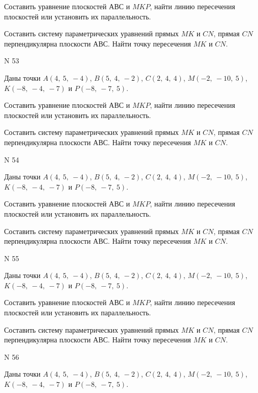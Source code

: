\documentclass[11pt]{report}
\begin{document}
Составить уравнение плоскостей $АВС$ и $MKP$,
найти линию пересечения плоскостей или установить их параллельность.

Составить систему параметрических уравнений прямых $MK$ и $CN$,
прямая $CN$ перпендикулярна плоскости $АВС$. 
Найти точку пересечения $MK$ и $CN$.



 N 53

Даны точки $A\left( 4, \  5, \  -4\right)$, $B\left( 5, \  4, \  -2\right)$, $C\left( 2, \  4, \  4\right)$, $M\left( -2, \  -10, \  5\right)$, $K\left( -8, \  -4, \  -7\right)$ и $P\left( -8, \  -7, \  5\right)$.


Составить уравнение плоскостей $АВС$ и $MKP$,
найти линию пересечения плоскостей или установить их параллельность.

Составить систему параметрических уравнений прямых $MK$ и $CN$,
прямая $CN$ перпендикулярна плоскости $АВС$. 
Найти точку пересечения $MK$ и $CN$.



 N 54

Даны точки $A\left( 4, \  5, \  -4\right)$, $B\left( 5, \  4, \  -2\right)$, $C\left( 2, \  4, \  4\right)$, $M\left( -2, \  -10, \  5\right)$, $K\left( -8, \  -4, \  -7\right)$ и $P\left( -8, \  -7, \  5\right)$.


Составить уравнение плоскостей $АВС$ и $MKP$,
найти линию пересечения плоскостей или установить их параллельность.

Составить систему параметрических уравнений прямых $MK$ и $CN$,
прямая $CN$ перпендикулярна плоскости $АВС$. 
Найти точку пересечения $MK$ и $CN$.



 N 55

Даны точки $A\left( 4, \  5, \  -4\right)$, $B\left( 5, \  4, \  -2\right)$, $C\left( 2, \  4, \  4\right)$, $M\left( -2, \  -10, \  5\right)$, $K\left( -8, \  -4, \  -7\right)$ и $P\left( -8, \  -7, \  5\right)$.


Составить уравнение плоскостей $АВС$ и $MKP$,
найти линию пересечения плоскостей или установить их параллельность.

Составить систему параметрических уравнений прямых $MK$ и $CN$,
прямая $CN$ перпендикулярна плоскости $АВС$. 
Найти точку пересечения $MK$ и $CN$.



 N 56

Даны точки $A\left( 4, \  5, \  -4\right)$, $B\left( 5, \  4, \  -2\right)$, $C\left( 2, \  4, \  4\right)$, $M\left( -2, \  -10, \  5\right)$, $K\left( -8, \  -4, \  -7\right)$ и $P\left( -8, \  -7, \  5\right)$.
\end{document}
